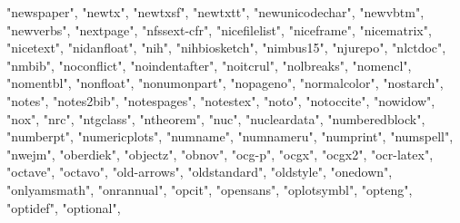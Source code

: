 \documentclass[
]{article}
\newenvironment{Shaded}{\begin{snugshade}}{\end{snugshade}}
\newcommand{\NormalTok}[1]{#1}
\newcommand{\StringTok}[1]{\textcolor[rgb]{0.31,0.60,0.02}{#1}}
\begin{document}
\begin{Shaded}
\begin{Highlighting}[]
\StringTok{"newspaper"}\NormalTok{, }\StringTok{"newtx"}\NormalTok{, }\StringTok{"newtxsf"}\NormalTok{, }\StringTok{"newtxtt"}\NormalTok{, }\StringTok{"newunicodechar"}\NormalTok{, }
\StringTok{"newvbtm"}\NormalTok{, }\StringTok{"newverbs"}\NormalTok{, }\StringTok{"nextpage"}\NormalTok{, }\StringTok{"nfssext{-}cfr"}\NormalTok{, }\StringTok{"nicefilelist"}\NormalTok{, }
\StringTok{"niceframe"}\NormalTok{, }\StringTok{"nicematrix"}\NormalTok{, }\StringTok{"nicetext"}\NormalTok{, }\StringTok{"nidanfloat"}\NormalTok{, }\StringTok{"nih"}\NormalTok{, }\StringTok{"nihbiosketch"}\NormalTok{, }
\StringTok{"nimbus15"}\NormalTok{, }\StringTok{"njurepo"}\NormalTok{, }\StringTok{"nlctdoc"}\NormalTok{, }\StringTok{"nmbib"}\NormalTok{, }\StringTok{"noconflict"}\NormalTok{, }\StringTok{"noindentafter"}\NormalTok{, }
\StringTok{"noitcrul"}\NormalTok{, }\StringTok{"nolbreaks"}\NormalTok{, }\StringTok{"nomencl"}\NormalTok{, }\StringTok{"nomentbl"}\NormalTok{, }\StringTok{"nonfloat"}\NormalTok{, }\StringTok{"nonumonpart"}\NormalTok{, }
\StringTok{"nopageno"}\NormalTok{, }\StringTok{"normalcolor"}\NormalTok{, }\StringTok{"nostarch"}\NormalTok{, }\StringTok{"notes"}\NormalTok{, }\StringTok{"notes2bib"}\NormalTok{, }
\StringTok{"notespages"}\NormalTok{, }\StringTok{"notestex"}\NormalTok{, }\StringTok{"noto"}\NormalTok{, }\StringTok{"notoccite"}\NormalTok{, }\StringTok{"nowidow"}\NormalTok{, }\StringTok{"nox"}\NormalTok{, }
\StringTok{"nrc"}\NormalTok{, }\StringTok{"ntgclass"}\NormalTok{, }\StringTok{"ntheorem"}\NormalTok{, }\StringTok{"nuc"}\NormalTok{, }\StringTok{"nucleardata"}\NormalTok{, }\StringTok{"numberedblock"}\NormalTok{, }
\StringTok{"numberpt"}\NormalTok{, }\StringTok{"numericplots"}\NormalTok{, }\StringTok{"numname"}\NormalTok{, }\StringTok{"numnameru"}\NormalTok{, }\StringTok{"numprint"}\NormalTok{, }
\StringTok{"numspell"}\NormalTok{, }\StringTok{"nwejm"}\NormalTok{, }\StringTok{"oberdiek"}\NormalTok{, }\StringTok{"objectz"}\NormalTok{, }\StringTok{"obnov"}\NormalTok{, }\StringTok{"ocg{-}p"}\NormalTok{, }
\StringTok{"ocgx"}\NormalTok{, }\StringTok{"ocgx2"}\NormalTok{, }\StringTok{"ocr{-}latex"}\NormalTok{, }\StringTok{"octave"}\NormalTok{, }\StringTok{"octavo"}\NormalTok{, }\StringTok{"old{-}arrows"}\NormalTok{, }
\StringTok{"oldstandard"}\NormalTok{, }\StringTok{"oldstyle"}\NormalTok{, }\StringTok{"onedown"}\NormalTok{, }\StringTok{"onlyamsmath"}\NormalTok{, }\StringTok{"onrannual"}\NormalTok{, }
\StringTok{"opcit"}\NormalTok{, }\StringTok{"opensans"}\NormalTok{, }\StringTok{"oplotsymbl"}\NormalTok{, }\StringTok{"opteng"}\NormalTok{, }\StringTok{"optidef"}\NormalTok{, }\StringTok{"optional"}\NormalTok{, }

\end{Highlighting}
\end{Shaded}
\end{document}
